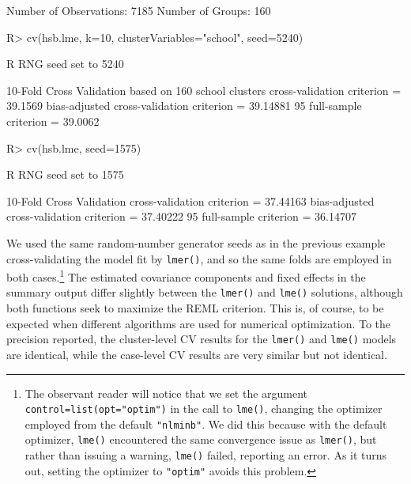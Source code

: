 \documentclass[
]{jss}
\begin{document}
\begin{CodeChunk}
\begin{CodeOutput}
Number of Observations: 7185
Number of Groups: 160 
\end{CodeOutput}
\begin{CodeInput}
R> cv(hsb.lme, k=10, clusterVariables="school", seed=5240)
\end{CodeInput}
\begin{CodeOutput}
R RNG seed set to 5240
\end{CodeOutput}
\begin{CodeOutput}
10-Fold Cross Validation based on 160 {school} clusters
cross-validation criterion = 39.1569
bias-adjusted cross-validation criterion = 39.14881
95%
full-sample criterion = 39.0062 
\end{CodeOutput}
\begin{CodeInput}
R> cv(hsb.lme, seed=1575)
\end{CodeInput}
\begin{CodeOutput}
R RNG seed set to 1575
\end{CodeOutput}
\begin{CodeOutput}
10-Fold Cross Validation
cross-validation criterion = 37.44163
bias-adjusted cross-validation criterion = 37.40222
95%
full-sample criterion = 36.14707 
\end{CodeOutput}
\end{CodeChunk}

We used the same random-number generator seeds as in the previous
example cross-validating the model fit by \texttt{lmer()}, and so the
same folds are employed in both cases.\footnote{The observant reader
  will notice that we set the argument
  \texttt{control=list(opt="optim")} in the call to \texttt{lme()},
  changing the optimizer employed from the default \texttt{"nlminb"}. We
  did this because with the default optimizer, \texttt{lme()}
  encountered the same convergence issue as \texttt{lmer()}, but rather
  than issuing a warning, \texttt{lme()} failed, reporting an error. As
  it turns out, setting the optimizer to \texttt{"optim"} avoids this
  problem.} The estimated covariance components and fixed effects in the
summary output differ slightly between the \texttt{lmer()} and
\texttt{lme()} solutions, although both functions seek to maximize the
REML criterion. This is, of course, to be expected when different
algorithms are used for numerical optimization. To the precision
reported, the cluster-level CV results for the \texttt{lmer()} and
\texttt{lme()} models are identical, while the case-level CV results are
very similar but not identical.
\end{document}
